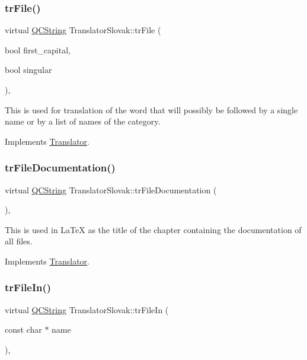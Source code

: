 \subsubsection{\texorpdfstring{trFile()}{trFile()}}
{\footnotesize\ttfamily virtual \mbox{\hyperlink{class_q_c_string}{Q\+C\+String}} Translator\+Slovak\+::tr\+File (\begin{DoxyParamCaption}\item[{bool}]{first\+\_\+capital,  }\item[{bool}]{singular }\end{DoxyParamCaption})\hspace{0.3cm}{\ttfamily [inline]}, {\ttfamily [virtual]}}

This is used for translation of the word that will possibly be followed by a single name or by a list of names of the category. 

Implements \mbox{\hyperlink{class_translator}{Translator}}.

\mbox{\label{class_translator_slovak_ad99f3e005f9c82f054e431450b5463f9}} 
\subsubsection{\texorpdfstring{trFileDocumentation()}{trFileDocumentation()}}
{\footnotesize\ttfamily virtual \mbox{\hyperlink{class_q_c_string}{Q\+C\+String}} Translator\+Slovak\+::tr\+File\+Documentation (\begin{DoxyParamCaption}{ }\end{DoxyParamCaption})\hspace{0.3cm}{\ttfamily [inline]}, {\ttfamily [virtual]}}

This is used in La\+TeX as the title of the chapter containing the documentation of all files. 

Implements \mbox{\hyperlink{class_translator}{Translator}}.

\mbox{\label{class_translator_slovak_aa62747de6f954359908a97e608b64fa6}} 
\subsubsection{\texorpdfstring{trFileIn()}{trFileIn()}}
{\footnotesize\ttfamily virtual \mbox{\hyperlink{class_q_c_string}{Q\+C\+String}} Translator\+Slovak\+::tr\+File\+In (\begin{DoxyParamCaption}\item[{const char $\ast$}]{name }\end{DoxyParamCaption})\hspace{0.3cm}{\ttfamily [inline]}, {\ttfamily [virtual]}}

